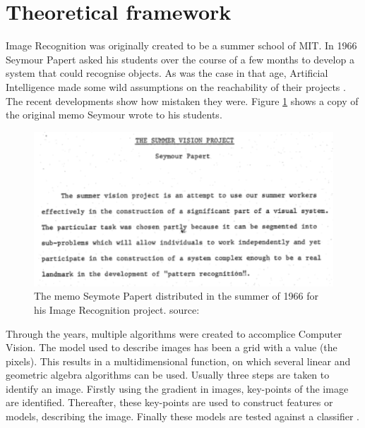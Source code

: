 \section{Theoretical framework}
\label{sec:Theory}
Image Recognition was originally created to be a summer school of MIT.
In 1966 Seymour Papert asked his students over the course of a few months to develop a system that could recognise objects.
As was the case in that age, Artificial Intelligence made some wild assumptions on the reachability of their projects \citep{szeliski2010computer}.
The recent developments show how mistaken they were.
Figure \ref{fig:mit-note} shows a copy of the original memo Seymour wrote to his students.

\begin{figure}%
\centering
\ifx\showfix\undefined
\includegraphics[keepaspectratio=true,width=.7\textwidth]{images/MITnote.png}\fi
\captionsetup{width=.7\textwidth}
\caption{The memo Seymote Papert distributed in the summer of 1966 for his Image Recognition project. source: \citet{mensink12phd}}
\label{fig:mit-note}
\end{figure}

Through the years, multiple algorithms were created to accomplice Computer Vision.
The model used to describe images has been a grid with a value (the pixels).
This results in a multidimensional function, on which several linear and geometric algebra algorithms can be used.
Usually three steps are taken to identify an image.
Firstly using the gradient in images, key-points of the image are identified.
Thereafter, these key-points are used to construct features or models, describing the image.
Finally these models are tested against a classifier \citep{szeliski2010computer}.

